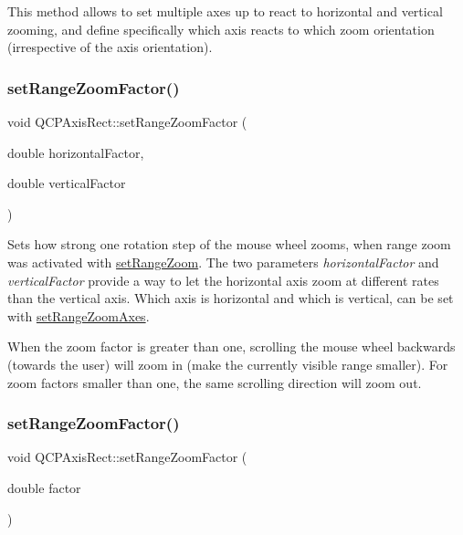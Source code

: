 This method allows to set multiple axes up to react to horizontal and vertical zooming, and define specifically which axis reacts to which zoom orientation (irrespective of the axis orientation). \mbox{\label{class_q_c_p_axis_rect_a895d7ac745ea614e04056244b3c138ac}} 
\subsubsection{\texorpdfstring{setRangeZoomFactor()}{setRangeZoomFactor()}\hspace{0.1cm}{\footnotesize\ttfamily [1/2]}}
{\footnotesize\ttfamily void Q\+C\+P\+Axis\+Rect\+::set\+Range\+Zoom\+Factor (\begin{DoxyParamCaption}\item[{double}]{horizontal\+Factor,  }\item[{double}]{vertical\+Factor }\end{DoxyParamCaption})}

Sets how strong one rotation step of the mouse wheel zooms, when range zoom was activated with \mbox{\hyperlink{class_q_c_p_axis_rect_a7960a9d222f1c31d558b064b60f86a31}{set\+Range\+Zoom}}. The two parameters {\itshape horizontal\+Factor} and {\itshape vertical\+Factor} provide a way to let the horizontal axis zoom at different rates than the vertical axis. Which axis is horizontal and which is vertical, can be set with \mbox{\hyperlink{class_q_c_p_axis_rect_a9442cca2aa358405f39a64d51eca13d2}{set\+Range\+Zoom\+Axes}}.

When the zoom factor is greater than one, scrolling the mouse wheel backwards (towards the user) will zoom in (make the currently visible range smaller). For zoom factors smaller than one, the same scrolling direction will zoom out. \mbox{\label{class_q_c_p_axis_rect_ae83d187b03fc6fa4f00765ad50cd3fc3}} 
\subsubsection{\texorpdfstring{setRangeZoomFactor()}{setRangeZoomFactor()}\hspace{0.1cm}{\footnotesize\ttfamily [2/2]}}
{\footnotesize\ttfamily void Q\+C\+P\+Axis\+Rect\+::set\+Range\+Zoom\+Factor (\begin{DoxyParamCaption}\item[{double}]{factor }\end{DoxyParamCaption})}

